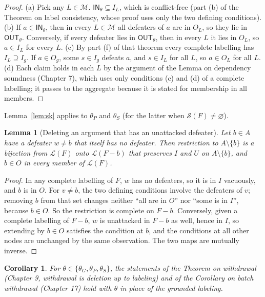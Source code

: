 \documentclass[11pt]{article}
\theoremstyle{plain}
\newtheorem{lemma}[theorem]{Lemma}
\newtheorem{corollary}[theorem]{Corollary}
\theoremstyle{definition}
\theoremstyle{remark}
\newcommand{\IN}{\textsf{IN}}
\newcommand{\OUT}{\textsf{OUT}}
\begin{document}
\begin{proof}
(a) Pick any $L\in\mathcal M$. $\IN_\theta\subseteq I_L$, which is conflict-free (part (b) of the Theorem on label consistency, whose proof uses only the two defining conditions). (b) If $a\in\IN_\theta$, then in every $L\in\mathcal M$ all defeaters of $a$ are in $O_L$, so they lie in $\OUT_\theta$. Conversely, if every defeater lies in $\OUT_\theta$, then in every $L$ it lies in $O_L$, so $a\in I_L$ for every $L$. (c) By part (f) of that theorem every complete labelling has $I_L\supseteq I_g$. If $a\in O_g$, some $s\in I_g$ defeats $a$, and $s\in I_L$ for all $L$, so $a\in O_L$ for all $L$. (d) Each claim holds in each $L$ by the argument of the Lemma on dependency soundness (Chapter 7), which uses only conditions (c) and (d) of a complete labelling; it passes to the aggregate because it is stated for membership in all members. \qedhere
\end{proof}

Lemma~\ref{lem:sk} applies to $\theta_P$ and $\theta_S$ (for the latter when $\mathcal S(F)\neq\varnothing$).

\begin{lemma}[Deleting an argument that has an unattacked defeater]\label{lem:anchored}
Let $b\in A$ have a defeater $w\ne b$ that itself has no defeater. Then restriction to $A\setminus\{b\}$ is a bijection from $\mathcal L(F)$ onto $\mathcal L(F-b)$ that preserves $I$ and $U$ on $A\setminus\{b\}$, and $b\in O$ in every member of $\mathcal L(F)$.
\end{lemma}

\begin{proof}
In any complete labelling of $F$, $w$ has no defeaters, so it is in $I$ vacuously, and $b$ is in $O$. For $v\ne b$, the two defining conditions involve the defeaters of $v$; removing $b$ from that set changes neither ``all are in $O$'' nor ``some is in $I$'', because $b\in O$. So the restriction is complete on $F-b$. Conversely, given a complete labelling of $F-b$, $w$ is unattacked in $F-b$ as well, hence in $I$, so extending by $b\in O$ satisfies the condition at $b$, and the conditions at all other nodes are unchanged by the same observation. The two maps are mutually inverse. \qedhere
\end{proof}

\begin{corollary}\label{cor:withdraw}
For $\theta\in\{\theta_G,\theta_P,\theta_S\}$, the statements of the Theorem on withdrawal (Chapter 9, withdrawal is deletion up to labeling) and of the Corollary on batch withdrawal (Chapter 17) hold with $\theta$ in place of the grounded labeling.
\end{corollary}
\end{document}
